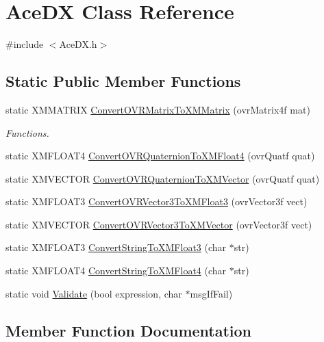 \hypertarget{class_ace_d_x}{}\section{Ace\+DX Class Reference}
\label{class_ace_d_x}


{\ttfamily \#include $<$Ace\+D\+X.\+h$>$}

\subsection*{Static Public Member Functions}
\begin{DoxyCompactItemize}
\item 
static X\+M\+M\+A\+T\+R\+IX \hyperlink{class_ace_d_x_ab38c3c8ccce57c043550c1e5f97c16aa}{Convert\+O\+V\+R\+Matrix\+To\+X\+M\+Matrix} (ovr\+Matrix4f mat)
\begin{DoxyCompactList}\small\item\em Functions. \end{DoxyCompactList}\item 
static X\+M\+F\+L\+O\+A\+T4 \hyperlink{class_ace_d_x_a68c76ff77c4aa708b1961aef535e7432}{Convert\+O\+V\+R\+Quaternion\+To\+X\+M\+Float4} (ovr\+Quatf quat)
\item 
static X\+M\+V\+E\+C\+T\+OR \hyperlink{class_ace_d_x_a68c7f8b8bb7391824dbd9384b87b92b2}{Convert\+O\+V\+R\+Quaternion\+To\+X\+M\+Vector} (ovr\+Quatf quat)
\item 
static X\+M\+F\+L\+O\+A\+T3 \hyperlink{class_ace_d_x_af5c5f29dedd59317396d70bbd9997cc4}{Convert\+O\+V\+R\+Vector3\+To\+X\+M\+Float3} (ovr\+Vector3f vect)
\item 
static X\+M\+V\+E\+C\+T\+OR \hyperlink{class_ace_d_x_a6534e6bad6c08d0563d8338f7e383a90}{Convert\+O\+V\+R\+Vector3\+To\+X\+M\+Vector} (ovr\+Vector3f vect)
\item 
static X\+M\+F\+L\+O\+A\+T3 \hyperlink{class_ace_d_x_a3b7c903c6bd444bc4381af91b824f38c}{Convert\+String\+To\+X\+M\+Float3} (char $\ast$str)
\item 
static X\+M\+F\+L\+O\+A\+T4 \hyperlink{class_ace_d_x_a0b7dad15e88b8ce8d449cfea4f70e4f5}{Convert\+String\+To\+X\+M\+Float4} (char $\ast$str)
\item 
static void \hyperlink{class_ace_d_x_abb325712698a5f2a3be18ed0adae27a3}{Validate} (bool expression, char $\ast$msg\+If\+Fail)
\end{DoxyCompactItemize}


\subsection{Member Function Documentation}
